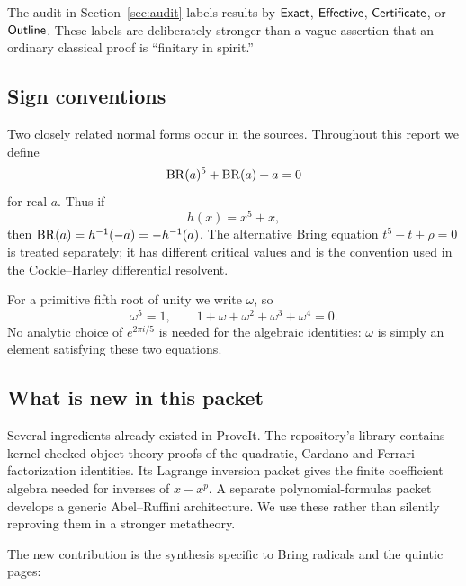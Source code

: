 The audit in Section~\ref{sec:audit} labels results by
\(\textsf{Exact}\), \(\textsf{Effective}\), \(\textsf{Certificate}\), or \(\textsf{Outline}\).  These labels
are deliberately stronger than a vague assertion that an ordinary classical
proof is ``finitary in spirit.''

\subsection{Sign conventions}

Two closely related normal forms occur in the sources.  Throughout this report
we define
\begin{equation}\label{eq:BRdef}
  \operatorname{BR}(a)^5+\operatorname{BR}(a)+a=0
\end{equation}
for real \(a\).  Thus if
\[
  h(x)=x^5+x,
\]
then \(\operatorname{BR}(a)=h^{-1}(-a)=-h^{-1}(a)\).  The alternative Bring equation
\(t^5-t+\rho=0\) is treated separately; it has different critical values and
is the convention used in the Cockle--Harley differential resolvent.

For a primitive fifth root of unity we write \(\omega\), so
\begin{equation}\label{eq:cyclo5}
 \omega^5=1,
 \qquad 1+\omega+\omega^2+\omega^3+\omega^4=0.
\end{equation}
No analytic choice of \(e^{2\pi i/5}\) is needed for the algebraic identities:
\(\omega\) is simply an element satisfying these two equations.

\subsection{What is new in this packet}

Several ingredients already existed in ProveIt.  The repository's
 library contains kernel-checked object-theory proofs of
the quadratic, Cardano and Ferrari factorization identities.  Its Lagrange
inversion packet gives the finite coefficient algebra needed for inverses of
\(x-x^p\).  A separate polynomial-formulas packet develops a generic
Abel--Ruffini architecture.  We use these rather than silently reproving them
in a stronger metatheory.

The new contribution is the synthesis specific to Bring radicals and the
quintic pages:

